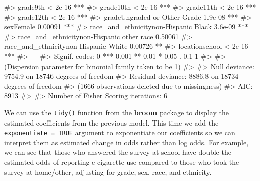 \documentclass[
  letterpaper,
]{latex/krantz}
\makeatletter
\newenvironment{Shaded}{\begin{snugshade}}{\end{snugshade}}
\newcommand{\CommentTok}[1]{\textcolor[rgb]{0.37,0.37,0.37}{#1}}
\newenvironment{kframe}{%
\medskip{}
\setlength{\fboxsep}{.8em}
 \def\at@end@of@kframe{}%
 \ifinner\ifhmode%
  \def\at@end@of@kframe{\end{minipage}}%
  \begin{minipage}{\columnwidth}%
 \fi\fi%
 \def\FrameCommand##1{\hskip\@totalleftmargin \hskip-\fboxsep
 \colorbox{shadecolor}{##1}\hskip-\fboxsep
     \hskip-\linewidth \hskip-\@totalleftmargin \hskip\columnwidth}%
 \MakeFramed {\advance\hsize-\width
   \@totalleftmargin\z@ \linewidth\hsize
   \@setminipage}}%
 {\par\unskip\endMakeFramed%
 \at@end@of@kframe}
\renewenvironment{Shaded}{\begin{kframe}}{\end{kframe}}
\makeatother
\begin{document}
\begin{Shaded}
\begin{Highlighting}[]
\CommentTok{\#\textgreater{} grade9th                                   \textless{} 2e{-}16 ***}
\CommentTok{\#\textgreater{} grade10th                                  \textless{} 2e{-}16 ***}
\CommentTok{\#\textgreater{} grade11th                                  \textless{} 2e{-}16 ***}
\CommentTok{\#\textgreater{} grade12th                                  \textless{} 2e{-}16 ***}
\CommentTok{\#\textgreater{} gradeUngraded or Other Grade               1.9e{-}08 ***}
\CommentTok{\#\textgreater{} sexFemale                                  0.00091 ***}
\CommentTok{\#\textgreater{} race\_and\_ethnicitynon{-}Hispanic Black       3.6e{-}09 ***}
\CommentTok{\#\textgreater{} race\_and\_ethnicitynon{-}Hispanic other race  0.50061    }
\CommentTok{\#\textgreater{} race\_and\_ethnicitynon{-}Hispanic White       0.00726 ** }
\CommentTok{\#\textgreater{} locationschool                             \textless{} 2e{-}16 ***}
\CommentTok{\#\textgreater{} {-}{-}{-}}
\CommentTok{\#\textgreater{} Signif. codes:  0 \textquotesingle{}***\textquotesingle{} 0.001 \textquotesingle{}**\textquotesingle{} 0.01 \textquotesingle{}*\textquotesingle{} 0.05 \textquotesingle{}.\textquotesingle{} 0.1 \textquotesingle{} \textquotesingle{} 1}
\CommentTok{\#\textgreater{} }
\CommentTok{\#\textgreater{} (Dispersion parameter for binomial family taken to be 1)}
\CommentTok{\#\textgreater{} }
\CommentTok{\#\textgreater{}     Null deviance: 9754.9  on 18746  degrees of freedom}
\CommentTok{\#\textgreater{} Residual deviance: 8886.8  on 18734  degrees of freedom}
\CommentTok{\#\textgreater{}   (1666 observations deleted due to missingness)}
\CommentTok{\#\textgreater{} AIC: 8913}
\CommentTok{\#\textgreater{} }
\CommentTok{\#\textgreater{} Number of Fisher Scoring iterations: 6}
\end{Highlighting}
\end{Shaded}

We can use the \texttt{tidy()}
function from the \textbf{broom} package to
display the estimated coefficients from the previous model. This time we
add the \texttt{exponentiate\ =\ TRUE} argument to exponentiate our
coefficients so we can interpret them as estimated change in odds rather
than log odds. For example, we can see that those who answered the
survey at school have double the estimated odds of reporting e-cigarette
use compared to those who took the survey at home/other, adjusting for
grade, sex, race, and ethnicity.
\end{document}
